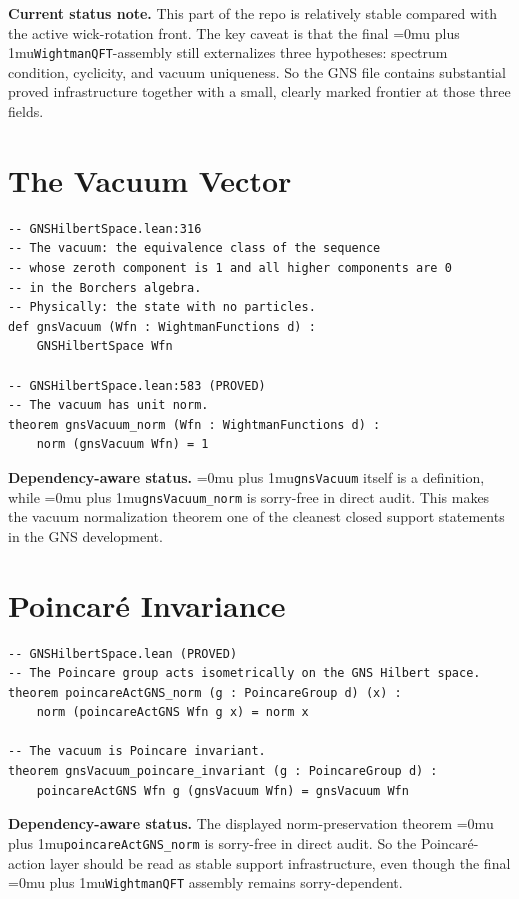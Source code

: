 \documentclass[11pt,a4paper]{article}
\newcommand{\leanname}[1]{\begingroup\Urlmuskip=0mu plus 1mu\relax\nolinkurl{#1}\endgroup}
\begin{document}
\medskip\noindent
\textbf{Current status note.}
This part of the repo is relatively stable compared with the active
wick-rotation front. The key caveat is that the final
\leanname{WightmanQFT}-assembly still externalizes three hypotheses:
spectrum condition, cyclicity, and vacuum uniqueness. So the GNS file contains
substantial proved infrastructure together with a small, clearly marked frontier
at those three fields.

\section{The Vacuum Vector}

\begin{lstlisting}
-- GNSHilbertSpace.lean:316
-- The vacuum: the equivalence class of the sequence
-- whose zeroth component is 1 and all higher components are 0
-- in the Borchers algebra.
-- Physically: the state with no particles.
def gnsVacuum (Wfn : WightmanFunctions d) :
    GNSHilbertSpace Wfn

-- GNSHilbertSpace.lean:583 (PROVED)
-- The vacuum has unit norm.
theorem gnsVacuum_norm (Wfn : WightmanFunctions d) :
    norm (gnsVacuum Wfn) = 1
\end{lstlisting}

\medskip\noindent
\textbf{Dependency-aware status.}
\leanname{gnsVacuum} itself is a definition, while
\leanname{gnsVacuum\_norm} is sorry-free in direct audit. This makes the vacuum
normalization theorem one of the cleanest closed support statements in the GNS
development.

\section{Poincar\'e Invariance}

\begin{lstlisting}
-- GNSHilbertSpace.lean (PROVED)
-- The Poincare group acts isometrically on the GNS Hilbert space.
theorem poincareActGNS_norm (g : PoincareGroup d) (x) :
    norm (poincareActGNS Wfn g x) = norm x

-- The vacuum is Poincare invariant.
theorem gnsVacuum_poincare_invariant (g : PoincareGroup d) :
    poincareActGNS Wfn g (gnsVacuum Wfn) = gnsVacuum Wfn
\end{lstlisting}

\medskip\noindent
\textbf{Dependency-aware status.}
The displayed norm-preservation theorem \leanname{poincareActGNS\_norm} is
sorry-free in direct audit. So the Poincar\'e-action layer should be read as
stable support infrastructure, even though the final \leanname{WightmanQFT}
assembly remains sorry-dependent.
\end{document}
